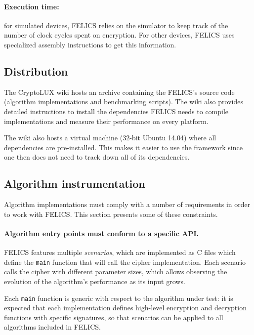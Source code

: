 \documentclass{article}
\begin{document}
\paragraph{Execution time:} for simulated devices, FELICS relies on
the simulator to keep track of the number of clock cycles spent on
encryption.  For other devices, FELICS uses specialized assembly
instructions to get this information.

\subsection{Distribution}
\label{sec:felics/dist}

The CryptoLUX wiki\cite{FELICS:wiki} hosts an archive containing the
FELICS's source code (algorithm implementations and benchmarking
scripts).  The wiki also provides detailed instructions to install the
dependencies FELICS needs to compile implementations and measure their
performance on every platform.

The wiki also hosts a virtual machine (32-bit Ubuntu 14.04) where all
dependencies are pre-installed.  This makes it easier to use the
framework since one then does not need to track down all of its
dependencies.

\subsection{Algorithm instrumentation}
\label{sec:felics/adding-algos}

Algorithm implementations must comply with a number of requirements in
order to work with FELICS.  This section presents some of these
constraints.

\paragraph{Algorithm entry points must conform to a specific API.}
FELICS features multiple \emph{scenarios}, which are implemented as C
files which define the \texttt{main} function that will call the
cipher implementation.  Each scenario calls the cipher with different
parameter sizes, which allows observing the evolution of the
algorithm's performance as its input grows.

Each \texttt{main} function is generic with respect to the algorithm
under test: it is expected that each implementation defines high-level
encryption and decryption functions with specific signatures, so that
scenarios can be applied to all algorithms included in FELICS.
\end{document}
